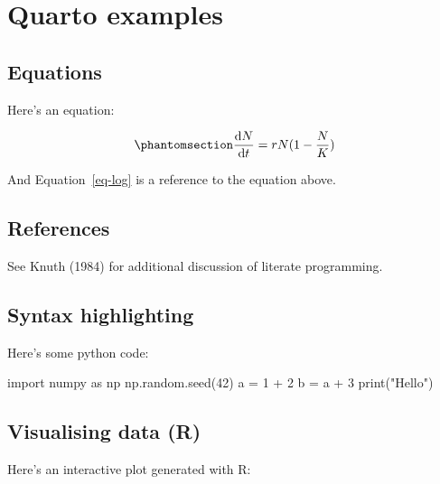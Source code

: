 \documentclass[
  letterpaper,
  DIV=11,
  numbers=noendperiod]{scrreprt}
\newenvironment{Shaded}{\begin{snugshade}}{\end{snugshade}}
\newcommand{\BuiltInTok}[1]{\textcolor[rgb]{0.00,0.23,0.31}{#1}}
\newcommand{\DecValTok}[1]{\textcolor[rgb]{0.68,0.00,0.00}{#1}}
\newcommand{\ImportTok}[1]{\textcolor[rgb]{0.00,0.46,0.62}{#1}}
\newcommand{\NormalTok}[1]{\textcolor[rgb]{0.00,0.23,0.31}{#1}}
\newcommand{\OperatorTok}[1]{\textcolor[rgb]{0.37,0.37,0.37}{#1}}
\newcommand{\StringTok}[1]{\textcolor[rgb]{0.13,0.47,0.30}{#1}}
\theoremstyle{definition}
\theoremstyle{remark}
\begin{document}
\cleardoublepage
{}
{}
\appendix

\chapter{Quarto examples}\label{quarto-examples-1}

\section{Equations}\label{equations-12}

Here's an equation:

\begin{equation}\phantomsection\label{eq-log}{ 
\frac{\mathrm{d}N}{\mathrm{d}t} = rN(1 - \frac{N}{K}) 
}\end{equation}

And Equation~\ref{eq-log} is a reference to the equation above.

\section{References}\label{references-13}

See Knuth (1984) for additional discussion of literate programming.

\section{Syntax highlighting}\label{syntax-highlighting-12}

Here's some python code:

\begin{Shaded}
\begin{Highlighting}[]
\ImportTok{import}\NormalTok{ numpy }\ImportTok{as}\NormalTok{ np}
\NormalTok{np.random.seed(}\DecValTok{42}\NormalTok{)}
\NormalTok{a }\OperatorTok{=} \DecValTok{1} \OperatorTok{+} \DecValTok{2}
\NormalTok{b }\OperatorTok{=}\NormalTok{ a }\OperatorTok{+} \DecValTok{3}
\BuiltInTok{print}\NormalTok{(}\StringTok{"Hello"}\NormalTok{)}
\end{Highlighting}
\end{Shaded}

\section{Visualising data (R)}\label{visualising-data-r-12}

Here's an interactive plot generated with R:
\end{document}
